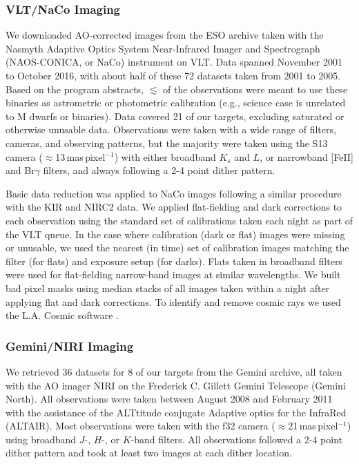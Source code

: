 \documentclass[twocolumn]{aastex62}
\begin{document}
\subsubsection{VLT/NaCo Imaging}

We downloaded AO-corrected images from the ESO archive taken with the Nasmyth Adaptive Optics System Near-Infrared Imager and Spectrograph (NAOS-CONICA, or NaCo) instrument on VLT. Data spanned November 2001 to October 2016, with about half of these 72 datasets taken from 2001 to 2005. Based on the program abstracts, $\lesssim$ of the observations were meant to use these binaries as astrometric or photometric calibration (e.g., science case is unrelated to M dwarfs or binaries). Data covered 21 of our targets, excluding saturated or otherwise unusable data. Observations were taken with a wide range of filters, cameras, and observing patterns, but the majority were taken using the S13 camera ($\approx$13\,mas\,pixel$^{-1}$) with either broadband $K_s$ and $L$, or narrowband [FeII] and Br$\gamma$ filters, and always following a 2-4 point dither pattern. 

Basic data reduction was applied to NaCo images following a similar procedure with the KIR and NIRC2 data. We applied flat-fielding and dark corrections to each observation using the standard set of calibrations taken each night as part of the VLT queue. In the case where calibration (dark or flat) images were missing or unusable, we used the nearest (in time) set of calibration images matching the filter (for flats) and exposure setup (for darks). Flats taken in broadband filters were used for flat-fielding narrow-band images at similar wavelengths. We built bad pixel masks using median stacks of all images taken within a night after applying flat and dark corrections. To identify and remove cosmic rays we used the L.A. Cosmic software \citep{2001PASP..113.1420V}.


\subsubsection{Gemini/NIRI Imaging}
We retrieved 36 datasets for 8 of our targets from the Gemini archive, all taken with the AO imager NIRI \citep{2003PASP..115.1388H} on the Frederick C. Gillett Gemini Telescope (Gemini North). All observations were taken between August 2008 and February 2011 with the assistance of the ALTtitude conjugate Adaptive optics for the InfraRed (ALTAIR). Most observations were taken with the f32 camera ($\approx$21\,mas\,pixel$^{-1}$) using broadband $J$-, $H$-, or $K$-band filters. All observations followed a 2-4 point dither pattern and took at least two images at each dither location. 
\end{document}
